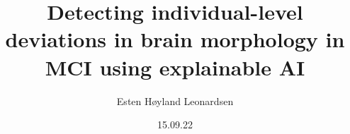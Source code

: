\documentclass[t]{beamer}
\author{Esten H{\o}yland Leonardsen}
\institute[Life Science, UiO]{UiO:Life Science, University of Oslo}
\date{15.09.22}
\title{Detecting individual-level deviations in brain morphology in MCI using explainable AI}
\begin{document}
	\newcommand{\N}{100}

	\newcommand{\nodesize}{11pt}
	\newcommand{\hsep}{28pt}
	\newcommand{\vsep}{14pt}

	\newcommand{\arrowwidth}{0.05cm}
	\newcommand{\innerarrow}{{Latex[length=0.1cm, width=0.15cm]}}
	\newcommand{\outerarrow}{{Latex[length=0.2cm, width=0.3cm]}}

	\def\plotwidth{11.68}

	\newcommand{\mrivsep}{0.52}
	\newcommand{\mrihsep}{0.44}


	\begin{frame}
		\maketitle
	\end{frame}
\end{document}
